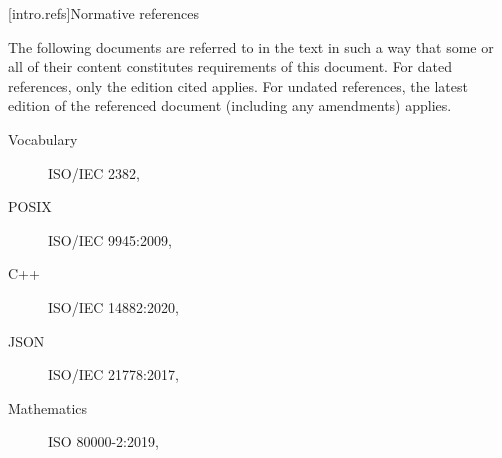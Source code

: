 
[intro.refs]{Normative references}%
%

\pnum
{}%
The following documents are referred to in the text in such a way that some or
all of their content constitutes requirements of this document. For dated
references, only the edition cited applies. For undated references, the latest
edition of the referenced document (including any amendments) applies.

\begin{description}


\item[Vocabulary] ISO/IEC 2382, 
\item[POSIX] ISO/IEC 9945:2009, 
\item[C++] ISO/IEC 14882:2020, 
\item[JSON] ISO/IEC 21778:2017, 
\item[Mathematics] ISO 80000-2:2019, 


\end{description}
